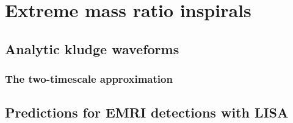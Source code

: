 \chapter{Extreme mass ratio inspirals}

\section{Analytic kludge waveforms}

\subsection{The two-timescale approximation}

\section{Predictions for EMRI detections with LISA}